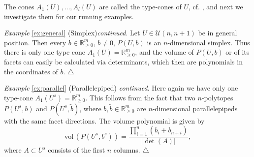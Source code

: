 \documentclass[11pt, a4paper, twoside, reqno]{amsart}
\newcommand{\R}{\mathbb{R}}
\theoremstyle{definition}
\theoremstyle{remark}
\newcommand{\vol}{\mathrm{vol}\,}
\numberwithin{equation}{section}
\begin{document}
The cones $A_1(U),\dots,A_l(U)$ are called the type-cones of $U$, cf. \cite{mcmullen1973representations}, and next we investigate them for our running examples.

\medskip\noindent
{\it Example} \ref{ex:general} (Simplex){\it continued}.
Let $U \in\mathcal{U}(n,n+1)$ be in general position. Then every $b\in\R^m_{\geq 0}$, $b\ne 0$,  $P(U,b)$ is an $n$-dimensional simplex. Thus there is only one type cone $A_1(U)=\R^m_{\geq 0}$, and the volume of $P(U,b)$ or of its facets can easily be calculated via determinants, which then are polynomials in the coordinates of $b$.   \hfill$\triangle$


\medskip\noindent
{\it Example} \ref{ex:parallel} (Parallelepiped) {\it continued}. Here again we have only one type-cone $A_1(U^s) = \R_{\geq 0}^m$. This follows from the fact that two $n$-polytopes $P(U^s,b)$ and $P(U^s,\tilde{b})$, where $b, \tilde{b} \in\R^m_{\geq 0}$ are $n$-dimensional parallelepipeds with the same facet directions. The volume polynomial is given by
\begin{equation*}
   \vol(P(U^s,b^s))= \frac{ \prod_{i=1}^n (b_i+b_{n+i})}{ |\det(A)|},
\end{equation*}
where $A\subset U^s$ consists of the first $n$ columns. \hfill$\triangle$



\end{document}
